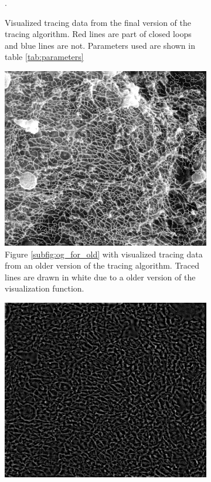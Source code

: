 \documentclass[12pt,english,twocolumn]{revtex4}
\begin{document}
\begin{figure}[t]
\begin{subfigure}[b]{.48\linewidth}
        \caption{Visualized tracing data from the final version of the tracing algorithm. Red lines are part of closed loops and blue lines are not. Parameters used are shown in table \ref{tab:parameters}}.
    \end{subfigure}
    \begin{subfigure}[b]{.48\linewidth}
        \includegraphics[width=\linewidth]{figures/old_trace_og.png}
        \caption{Figure \ref{subfig:og_for_old} with visualized tracing data from an older version of the tracing algorithm. Traced lines are drawn in white due to a older version of the visualization function.\vspace*{\baselineskip}}
        \label{subfig:og_traced_old}
    \end{subfigure}\hspace{.02\linewidth}%
    \begin{subfigure}[b]{.48\linewidth}
        \includegraphics[width=\linewidth]{figures/old_filter_og.png}

\end{subfigure}
\end{figure}
\end{document}
